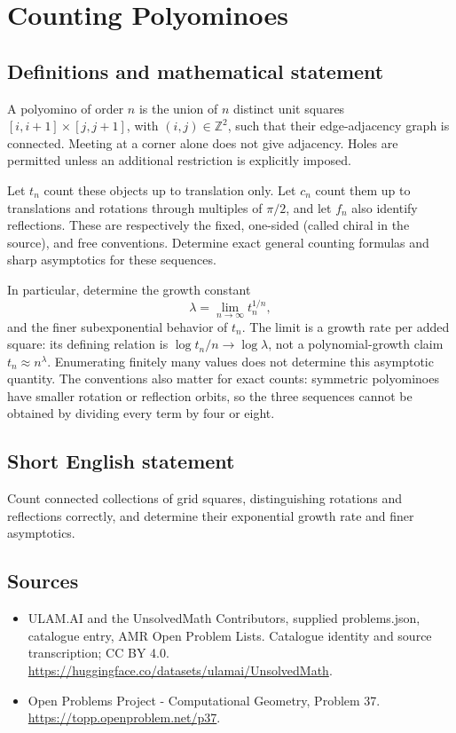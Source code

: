 \documentclass[11pt,a4paper]{article}
\begin{document}
\section*{Counting Polyominoes}\label{statement}

\subsection{Definitions and mathematical statement}
A polyomino of order $n$ is the union of $n$ distinct unit squares
$[i,i+1]\times[j,j+1]$, with $(i,j)\in\mathbb Z^2$, such that their
edge-adjacency graph is connected. Meeting at a corner alone does not
give adjacency. Holes are permitted unless an additional restriction
is explicitly imposed.

Let $t_n$ count these objects up to translation only. Let $c_n$ count
them up to translations and rotations through multiples of $\pi/2$,
and let $f_n$ also identify reflections. These are respectively the
fixed, one-sided (called chiral in the source), and free conventions.
Determine exact general counting formulas and sharp asymptotics for
these sequences.

In particular, determine the growth constant
\[
                  \lambda=\lim_{n\to\infty} t_n^{1/n},
\]
and the finer subexponential behavior of $t_n$. The limit is a growth
rate per added square: its defining relation is
$\log t_n/n\to\log\lambda$, not a polynomial-growth claim
$t_n\approx n^\lambda$.
Enumerating finitely many values does not determine this asymptotic
quantity. The conventions also matter for exact counts: symmetric
polyominoes have smaller rotation or reflection orbits, so the three
sequences cannot be obtained by dividing every term by four or eight.
\subsection{Short English statement}
Count connected collections of grid squares, distinguishing rotations
and reflections correctly, and determine their exponential growth rate
and finer asymptotics.
\subsection{Sources}
\begin{itemize}
\item[S1] ULAM.AI and the UnsolvedMath Contributors, supplied problems.json, catalogue entry, AMR Open Problem Lists. Catalogue identity and source transcription; CC BY 4.0.
\url{https://huggingface.co/datasets/ulamai/UnsolvedMath}.
\item[S2] Open Problems Project - Computational Geometry, Problem 37. 
\url{https://topp.openproblem.net/p37}.
\end{itemize}
\end{document}
